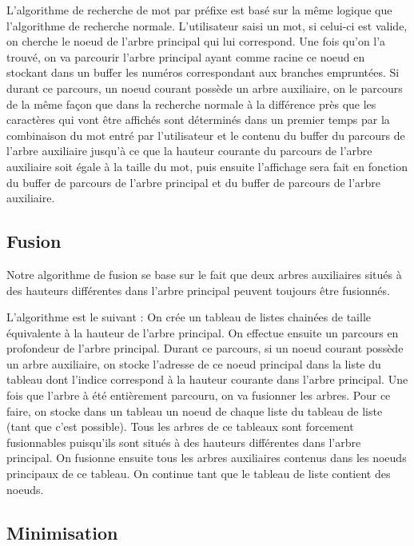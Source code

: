 \documentclass[15pt, a4paper]{article}
\begin{document}
L'algorithme de recherche de mot par préfixe est basé sur la même logique que
l'algorithme de recherche normale. L'utilisateur saisi un mot, si celui-ci est
valide, on cherche le noeud de l'arbre principal qui lui correspond. Une fois
qu'on l'a trouvé, on va parcourir l'arbre principal ayant comme racine ce 
noeud en stockant dans un buffer les numéros correspondant aux branches 
empruntées. Si durant ce parcours, un noeud courant possède un arbre auxiliaire,
on le parcours de la même façon que dans la recherche normale à la différence 
près que les caractères qui vont être affichés sont déterminés dans un premier 
temps par la combinaison du mot entré par l'utilisateur et le contenu du buffer
du parcours de l'arbre auxiliaire jusqu'à ce que la hauteur courante du parcours
de l'arbre auxiliaire soit égale à la taille du mot, puis ensuite l'affichage 
sera fait en fonction du buffer de parcours de l'arbre principal et du buffer de
parcours de l'arbre auxiliaire.

\subsection{Fusion}

Notre algorithme de fusion se base sur le fait que deux arbres auxiliaires 
situés à des hauteurs différentes dans l'arbre principal peuvent toujours être
fusionnés.

\bigskip

L'algorithme est le suivant : On crée un tableau de listes chainées de taille 
équivalente à la hauteur de l'arbre principal. On effectue ensuite un 
parcours en profondeur de l'arbre principal. Durant ce parcours, si un noeud
courant possède un arbre auxiliaire, on stocke l'adresse de ce noeud principal
dans la liste du tableau dont l'indice correspond à la hauteur courante
dans l'arbre principal. Une fois que l'arbre à été entièrement parcouru, on va 
fusionner les arbres. Pour ce faire, on stocke dans un tableau un noeud de 
chaque liste du tableau de liste (tant que c'est possible). Tous les arbres 
de ce tableaux sont forcement fusionnables puisqu'ils sont situés à des 
hauteurs différentes dans l'arbre principal. On fusionne ensuite tous les 
arbres auxiliaires contenus dans les noeuds principaux de ce tableau. On 
continue tant que le tableau de liste contient des noeuds.

\subsection{Minimisation}
\end{document}
